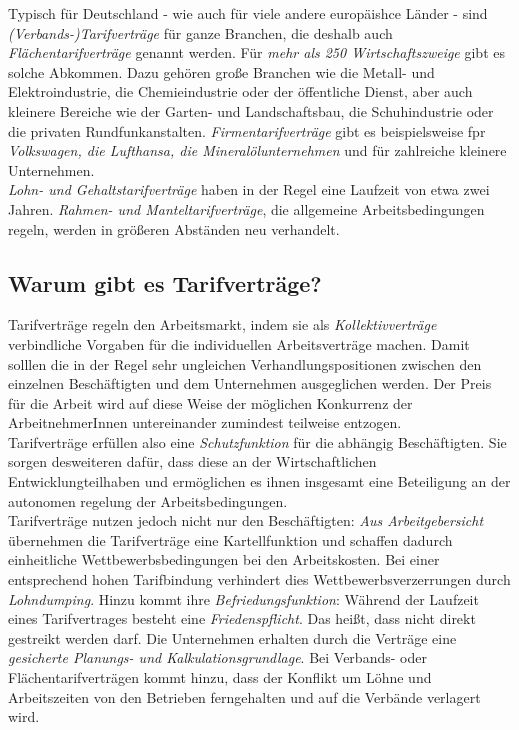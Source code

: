 \documentclass[a4paper, 12pt]{report}
\begin{document}
Typisch für Deutschland - wie auch für viele andere europäishce Länder - sind 
\emph{(Verbands-)Tarifverträge} für ganze Branchen, die deshalb auch 
\emph{Flächentarifverträge} genannt werden. Für \emph{mehr als 250 
Wirtschaftszweige} gibt es solche Abkommen. Dazu gehören große Branchen wie die 
Metall- und Elektroindustrie, die Chemieindustrie oder der öffentliche Dienst, 
aber auch kleinere Bereiche wie der Garten- und Landschaftsbau, die 
Schuhindustrie oder die privaten Rundfunkanstalten. \emph{Firmentarifverträge}
gibt es beispielsweise fpr \emph{Volkswagen, die Lufthansa, die 
Mineralölunternehmen} und für zahlreiche kleinere Unternehmen. \\

\emph{Lohn- und Gehaltstarifverträge} haben in der Regel eine Laufzeit von etwa 
zwei Jahren. \emph{Rahmen- und Manteltarifverträge}, die allgemeine 
Arbeitsbedingungen regeln, werden in größeren Abständen neu verhandelt. 

\subsection{Warum gibt es Tarifverträge?}

Tarifverträge regeln den Arbeitsmarkt, indem sie als \emph{Kollektivverträge} 
verbindliche Vorgaben für die individuellen Arbeitsverträge machen. Damit 
solllen die in der Regel sehr ungleichen Verhandlungspositionen zwischen den 
einzelnen Beschäftigten und dem Unternehmen ausgeglichen werden. Der Preis für 
die Arbeit wird auf diese Weise der möglichen Konkurrenz der ArbeitnehmerInnen
untereinander zumindest teilweise entzogen. \\

Tarifverträge erfüllen also eine \emph{Schutzfunktion} für die abhängig 
Beschäftigten. Sie sorgen desweiteren dafür, dass diese an der Wirtschaftlichen
Entwicklungteilhaben und ermöglichen es ihnen insgesamt eine Beteiligung an der 
autonomen regelung der Arbeitsbedingungen. \\

Tarifverträge nutzen jedoch nicht nur den Beschäftigten: \emph{Aus 
Arbeitgebersicht} übernehmen die Tarifverträge eine Kartellfunktion und schaffen
dadurch einheitliche Wettbewerbsbedingungen bei den Arbeitskosten. Bei einer
entsprechend hohen Tarifbindung verhindert dies Wettbewerbsverzerrungen durch 
\emph{Lohndumping}. Hinzu kommt ihre \emph{Befriedungsfunktion}: Während der 
Laufzeit eines Tarifvertrages besteht eine \emph{Friedenspflicht}. Das heißt, 
dass nicht direkt gestreikt werden darf. Die Unternehmen erhalten durch die 
Verträge eine \emph{gesicherte Planungs- und Kalkulationsgrundlage}. Bei 
Verbands- oder Flächentarifverträgen kommt hinzu, dass der Konflikt um Löhne und
Arbeitszeiten von den Betrieben ferngehalten und auf die Verbände verlagert 
wird. \\
\end{document}
